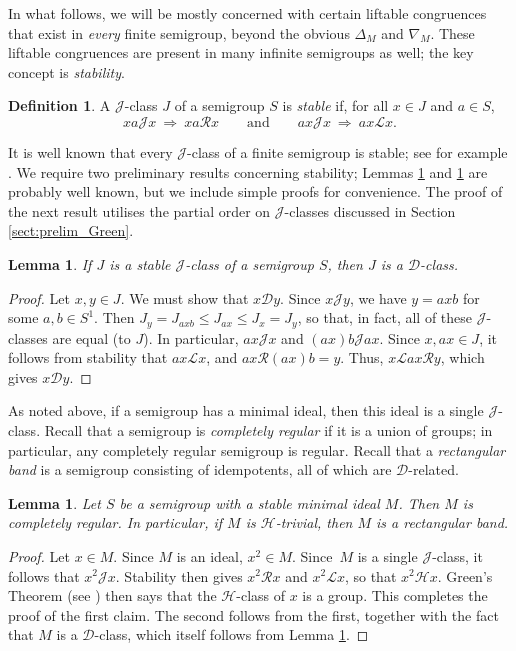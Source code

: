 \documentclass[11pt,a4paper]{article}
\renewcommand{\H}{\mathrel{\mathscr H}}
\renewcommand{\L}{\mathrel{\mathscr L}}
\newcommand{\R}{\mathrel{\mathscr R}}
\newcommand{\D}{\mathrel{\mathscr D}}
\newcommand{\gJ}{\mathrel{\mathscr J}}
\newcommand{\De}{\Delta}
\newcommand{\1}{\id_n}
\newcommand{\AND}{\qquad\text{and}\qquad}
\renewcommand{\implies}{\ \Rightarrow\ }
\newcommand{\pf}{\begin{proof}}
\newcommand{\epf}{\end{proof}}
\numberwithin{equation}{section}
\newtheorem{lemma}[equation]{Lemma}
\theoremstyle{definition}
\newtheorem{defn}[equation]{Definition}
\begin{document}
In what follows, we will be mostly concerned with certain liftable congruences
that exist in \emph{every} finite semigroup, beyond the obvious $\De_M$ and
$\nabla_M$.  These liftable congruences are present in many infinite semigroups as well; the key concept is \emph{stability}.

\begin{defn}\label{defn:stableJ}
A $\gJ$-class $J$ of a semigroup $S$ is \emph{stable} if, for all $x\in J$ and $a\in S$,
\[
xa\gJ x \implies xa\R x \AND ax\gJ x \implies ax\L x.
\]
\end{defn}

It is well known that every $\gJ$-class of a finite semigroup is stable; see for example \cite[Theorem A.2.4]{RSbook}.  We require two preliminary results concerning stability; Lemmas \ref{lem:stableJD} and \ref{lem:Mcr} are probably well known, but we include simple proofs for convenience.  The proof of the next result utilises the partial order on $\gJ$-classes discussed in Section \ref{sect:prelim_Green}.

\begin{lemma}\label{lem:stableJD}
If $J$ is a stable $\gJ$-class of a semigroup $S$, then $J$ is a $\D$-class.
\end{lemma}

\pf
Let $x,y\in J$.  We must show that $x\D y$.  Since $x\gJ y$, we have $y=axb$ for some $a,b\in S^1$.  Then $J_y = J_{axb} \leq J_{ax} \leq J_x = J_y$, so that, in fact, all of these $\gJ$-classes are equal (to $J$).  In particular, $ax\gJ x$ and $(ax)b\gJ ax$.  Since $x,ax\in J$, it follows from stability that $ax\L x$, and $ax \R (ax)b=y$.  Thus, $x\L ax\R y$, which gives $x\D y$.
\epf

As noted above, if a semigroup has a minimal ideal, then this ideal is a single $\gJ$-class.  Recall that a semigroup is \emph{completely regular} if it is a union of groups; in particular, any completely regular semigroup is regular.  Recall that a \emph{rectangular band} is a semigroup consisting of idempotents, all of which are $\D$-related.

\begin{lemma}\label{lem:Mcr}
Let $S$ be a semigroup with a stable minimal ideal $M$.  Then $M$ is completely regular.  In particular, if $M$ is $\H$-trivial, then $M$ is a rectangular band.
\end{lemma}

\pf 
Let $x\in M$.  Since $M$ is an ideal, $x^2\in M$.  Since~$M$ is a single $\gJ$-class, it follows that $x^2\gJ x$.  Stability then gives $x^2\R x$ and $x^2\L x$, so that $x^2\H x$.  Green's Theorem (see \cite[Theorem 2.2.5]{Howie}) then says that the $\H$-class of $x$ is a group.  This completes the proof of the first claim.  The second follows from the first, together with the fact that $M$ is a $\D$-class, which itself follows from Lemma \ref{lem:stableJD}.
\epf
\end{document}
